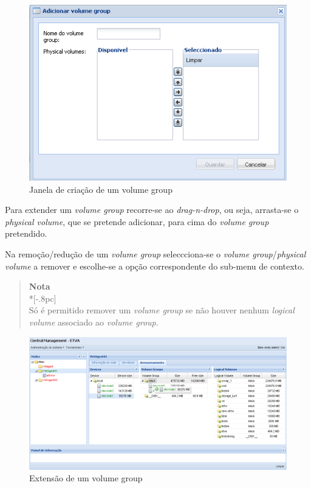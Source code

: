 \begin{figure}[H]
        \begin{center}
        \includegraphics[scale=0.5]{screenshots/storage_vg_create.png}
        \caption{Janela de criação de um volume group}
        \label{fig:storage_vg_create}
        \end{center}
\end{figure}

Para extender um \emph{volume group} recorre-se ao \emph{drag-n-drop}, ou seja, arrasta-se o \emph{physical volume}, que se pretende adicionar, para cima do \emph{volume group} pretendido.

Na remoção/redução de um \emph{volume group} seleccciona-se o \emph{volume group}/\emph{physical volume} a remover e escolhe-se a opção correspondente do sub-menu de contexto.
\begin{quote}
	{\large \bf Nota} \\*[-.8pc]
	\underline{\hspace{6in}} \\
	Só é permitido remover um \emph{volume group} se não houver nenhum \emph{logical volume} associado ao \emph{volume group}.
\end{quote}
 
\begin{figure}[H]
        \begin{center}
        \includegraphics[scale=0.45]{screenshots/storage_vg_extend.png}
        \caption{Extensão de um volume group}
        \label{fig:storage_vg_extend}
        \end{center}
\end{figure}

